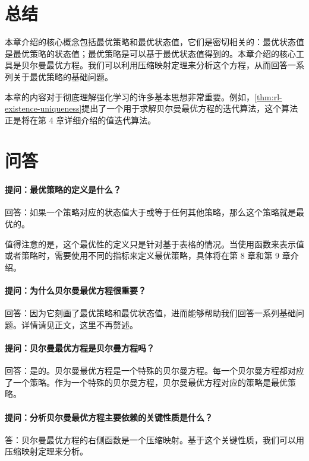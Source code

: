 \section{总结}
\label{sec:rl-bellman-opt-summary}

本章介绍的核心概念包括最优策略和最优状态值，它们是密切相关的：最优状态值是最优策略的状态值；最优策略是可以基于最优状态值得到的。本章介绍的核心工具是贝尔曼最优方程。我们可以利用压缩映射定理来分析这个方程，从而回答一系列关于最优策略的基础问题。

本章的内容对于彻底理解强化学习的许多基本思想非常重要。例如，\cref{thm:rl-existence-uniqueness}提出了一个用于求解贝尔曼最优方程的迭代算法，这个算法正是将在第 4 章详细介绍的值迭代算法。

\section{问答}
\label{sec:rl-bellman-opt-qa}

\paragraph{提问：最优策略的定义是什么？}
回答：如果一个策略对应的状态值大于或等于任何其他策略，那么这个策略就是最优的。

值得注意的是，这个最优性的定义只是针对基于表格的情况。当使用函数来表示值或者策略时，需要使用不同的指标来定义最优策略，具体将在第 8 章和第 9 章介绍。

\paragraph{提问：为什么贝尔曼最优方程很重要？}
回答：因为它刻画了最优策略和最优状态值，进而能够帮助我们回答一系列基础问题。详情请见正文，这里不再赘述。

\paragraph{提问：贝尔曼最优方程是贝尔曼方程吗？}
回答：是的。贝尔曼最优方程是一个特殊的贝尔曼方程。每一个贝尔曼方程都对应了一个策略。作为一个特殊的贝尔曼方程，贝尔曼最优方程对应的策略是最优策略。

\paragraph{提问：分析贝尔曼最优方程主要依赖的关键性质是什么？}
答：贝尔曼最优方程的右侧函数是一个压缩映射。基于这个关键性质，我们可以用压缩映射定理来分析。

